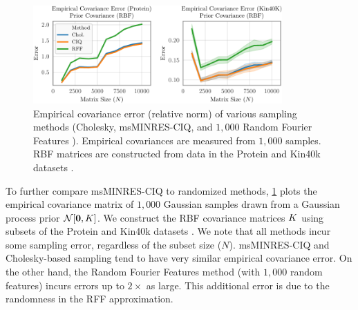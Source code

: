 \begin{figure}[ht!]
	\centering
	\includegraphics[width=0.85\textwidth]{figures/empirical_covariance_prior.pdf}
  \caption[
    Empirical covariance error of various sampling methods (Cholesky, msMINRES-CIQ, and Random Fourier Features).
  ]{
    Empirical covariance error (relative norm) of various sampling methods (Cholesky, msMINRES-CIQ, and $1,\!000$ Random Fourier Features \cite{rahimi2008random}).
    Empirical covariances are measured from $1,\!000$ samples.
    RBF matrices are constructed from data in the Protein and Kin40k datasets \cite{asuncion2007uci}.
  }
  \label{fig:empirical_covariance_matrix}
\end{figure}

To further compare msMINRES-CIQ to randomized methods, \cref{fig:empirical_covariance_matrix} plots the empirical covariance matrix of $1,\!000$ Gaussian samples drawn from a Gaussian process prior $\normaldist{\bzero}{\bK}$.
We construct the RBF covariance matrices $K$ using subsets of the Protein and Kin40k datasets \cite{asuncion2007uci}.
We note that all methods incur some sampling error, regardless of the subset size ($N$).
msMINRES-CIQ and Cholesky-based sampling tend to have very similar empirical covariance error.
On the other hand, the Random Fourier Features method \cite{rahimi2008random} (with $1,\!000$ random features) incurs errors up to $2\times$ as large.
This additional error is due to the randomness in the RFF approximation.

